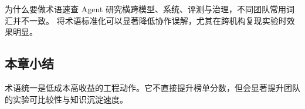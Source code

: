 \begin{knowledgebox}{为什么要做术语速查}
Agent 研究横跨模型、系统、评测与治理，不同团队常用词汇并不一致。  
将术语标准化可以显著降低协作误解，尤其在跨机构复现实验时效果明显。
\end{knowledgebox}

\subsection{本章小结}
术语统一是低成本高收益的工程动作。它不直接提升榜单分数，但会显著提升团队的实验可比较性与知识沉淀速度。


